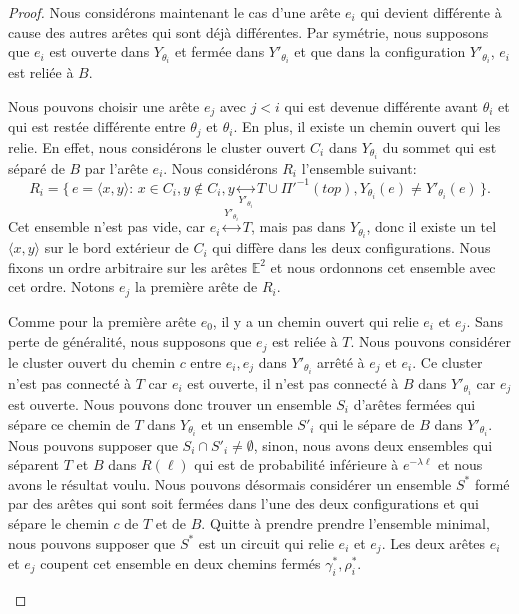 \documentclass[titlepage,a4paper,12pt]{article}
\begin{document}
\begin{proof}
Nous considérons maintenant le cas d'une arête $e_i$ qui devient différente à cause des autres arêtes qui sont déjà différentes. Par symétrie, nous supposons que $e_i$ est ouverte dans $Y_{\theta_i}$ et fermée dans $Y'_{\theta_i}$ et que dans la configuration $Y'_{\theta_i}$, $e_i$ est reliée à $B$.

Nous pouvons choisir une arête $e_j$ avec $j< i$ qui est devenue différente avant $\theta_i$ et qui est restée différente entre $\theta_j$ et $\theta_i$. En plus, il existe un chemin ouvert qui les relie. En effet, nous considérons le cluster ouvert $C_i$ dans $Y_{\theta_i}$ du sommet qui est séparé de $B$ par l'arête $e_i$. Nous considérons $R_i$ l'ensemble suivant:
$$ R_i = \big\{ \, e = \langle x,y\rangle:\, x\in C_i, y\notin C_i, y\underset{Y'_{\theta_i}}{\leftrightarrow} T\cup \Pi'^{-1}(top), Y_{\theta_i}(e)\neq Y'_{\theta_i}(e) \,\big\}.
$$
Cet ensemble n'est pas vide, car $e_i\overset{Y'_{\theta_i}}{\leftrightarrow} T$, mais pas dans $Y_{\theta_i}$, donc il existe un tel $\langle x,y\rangle$ sur le bord extérieur de $C_i$ qui diffère dans les deux configurations. Nous fixons un ordre arbitraire sur les arêtes $\mathbb{E}^2$ et nous ordonnons cet ensemble avec cet ordre. Notons $e_j$ la première arête de $R_i$.

Comme pour la première arête $e_0$, il y a un chemin ouvert qui relie $e_i$ et $e_j$. Sans perte de généralité, nous supposons que $e_j$ est reliée à $T$.
Nous pouvons considérer le cluster ouvert du chemin $c$ entre $e_i,e_j$ dans $Y'_{\theta_i}$ arrêté à $e_j$ et $e_i$. Ce cluster n'est pas connecté à $T$ car $e_i$ est ouverte, il n'est pas connecté à $B$ dans $Y'_{\theta_i}$ car $e_j$ est ouverte. Nous pouvons donc trouver un ensemble $S_i$ d'arêtes fermées qui sépare ce chemin de $T$ dans $Y_{\theta_i}$ et un ensemble $S'_i$ qui le sépare de $B$ dans $Y'_{\theta_i}$. Nous pouvons supposer que $S_i\cap S'_i \neq \emptyset$, sinon, nous avons deux ensembles qui séparent $T$ et $B$ dans $R(\ell)$ qui est de probabilité inférieure à $e^{-\lambda \ell}$ et nous avons le résultat voulu. Nous pouvons désormais considérer un ensemble $S^*$ formé par des arêtes qui sont soit fermées dans l'une des deux configurations et qui sépare le chemin $c$ de $T$ et de $B$. Quitte à prendre prendre l'ensemble minimal, nous pouvons supposer que $S^*$ est un circuit qui relie $e_i$ et $e_j$. Les deux arêtes $e_i$ et $e_j$ coupent cet ensemble en deux chemins fermés $\gamma_i^*, \rho_i^*$.
\begin{figure}[h]


\end{figure}
\end{proof}
\end{document}
